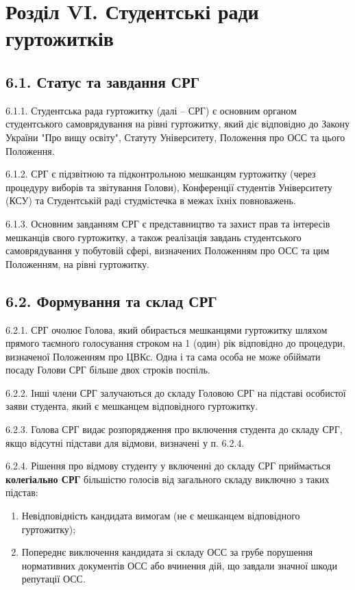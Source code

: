 \section*{Розділ VI. Студентські ради гуртожитків}

\subsection*{6.1. Статус та завдання СРГ}
    6.1.1. Студентська рада гуртожитку (далі – СРГ) є основним органом студентського самоврядування на рівні гуртожитку, який діє відповідно до Закону України "Про вищу освіту", Статуту Університету, Положення про ОСС та цього Положення.

    6.1.2. СРГ є підзвітною та підконтрольною мешканцям гуртожитку (через процедуру виборів та звітування Голови), Конференції студентів Університету (КСУ) та Студентській раді студмістечка в межах їхніх повноважень.

    6.1.3. Основним завданням СРГ є представництво та захист прав та інтересів мешканців свого гуртожитку, а також реалізація завдань студентського самоврядування у побутовій сфері, визначених Положенням про ОСС та цим Положенням, на рівні гуртожитку.

\subsection*{6.2. Формування та склад СРГ}
    6.2.1. СРГ очолює Голова, який обирається мешканцями гуртожитку шляхом прямого таємного голосування строком на 1 (один) рік відповідно до процедури, визначеної Положенням про ЦВКс. Одна і та сама особа не може обіймати посаду Голови СРГ більше двох строків поспіль.

    6.2.2. Інші члени СРГ залучаються до складу Головою СРГ на підставі особистої заяви студента, який є мешканцем відповідного гуртожитку.

    6.2.3. Голова СРГ видає розпорядження про включення студента до складу СРГ, якщо відсутні підстави для відмови, визначені у п. 6.2.4.

    6.2.4. Рішення про відмову студенту у включенні до складу СРГ приймається \textbf{колегіально СРГ} більшістю голосів від загального складу виключно з таких підстав:

        \begin{enumerate}[label=\alph*)]
            \item Невідповідність кандидата вимогам (не є мешканцем відповідного гуртожитку);
            \item Попереднє виключення кандидата зі складу ОСС за грубе порушення нормативних документів ОСС або вчинення дій, що завдали значної шкоди репутації ОСС.
        \end{enumerate}

